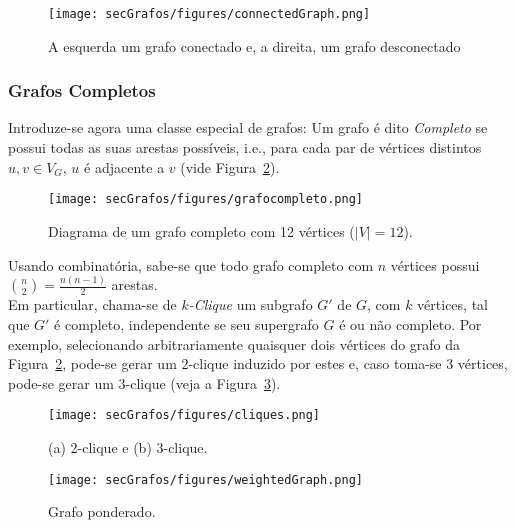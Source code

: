 \begin{figure}[H]
	\begin{center}
		\texttt{[image: secGrafos/figures/connectedGraph.png]}
	\end{center}
	\caption{A esquerda um grafo conectado e, a direita, um grafo desconectado}
	\label{fig:connectGraph}
\end{figure}

\subsubsection{Grafos Completos}

Introduze-se agora uma classe especial de grafos: Um grafo é dito \textit{Completo} se possui todas as suas arestas possíveis, i.e., para cada par de vértices distintos $u, v \in V_G$, $u$ é adjacente a $v$ (vide Figura~\ref{fig:grafocompleto}).

\begin{figure}[H]
	\begin{center}
		\texttt{[image: secGrafos/figures/grafocompleto.png]}
	\end{center}
	\caption{Diagrama de um grafo completo com 12 vértices ($|V| = 12$).}
	\label{fig:grafocompleto}
\end{figure}

Usando combinatória, sabe-se que todo grafo completo com $n$ vértices possui ${n \choose 2}=\frac{n(n-1)}{2}$ arestas.
\\

Em particular, chama-se de \textit{$k$-Clique} um subgrafo $G'$ de $G$, com $k$ vértices, tal que $G'$ é completo, independente se seu supergrafo $G$ é ou não completo. Por exemplo, selecionando arbitrariamente quaisquer dois vértices do grafo da Figura~\ref{fig:grafocompleto}, pode-se gerar um $2$-clique induzido por estes e, caso toma-se 3 vértices, pode-se gerar um $3$-clique (veja a Figura~\ref{fig:cliques}).

\begin{minipage}{0.55 \linewidth}
	\begin{figure}[H]
		\begin{center}
			\texttt{[image: secGrafos/figures/cliques.png]}
		\end{center}
		\caption{(a) 2-clique e (b) 3-clique.}
		\label{fig:cliques}
	\end{figure}
\end{minipage}
\hspace{0.1cm}
\begin{minipage}{0.40 \linewidth}
	\begin{figure}[H]
		\begin{center}
			\texttt{[image: secGrafos/figures/weightedGraph.png]}
		\end{center}
		\caption{Grafo ponderado.}
		\label{fig:weightedGraph}
	\end{figure}
\end{minipage}

